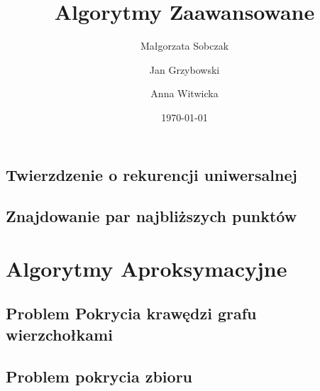 \documentclass[11pt,a4paper]{article}
\begin{document}
                  

\title{Algorytmy Zaawansowane}
\author{Małgorzata Sobczak \and Jan Grzybowski \and Anna Witwicka}
\date{\today}

\maketitle 
                
\clearpage

\tableofcontents
\clearpage













\subsection{Twierzdzenie o rekurencji uniwersalnej}


\subsection{Znajdowanie par najbliższych punktów}


\section{Algorytmy Aproksymacyjne}


\subsection{Problem Pokrycia krawędzi grafu wierzchołkami}


\subsection{Problem pokrycia zbioru}

\end{document}
